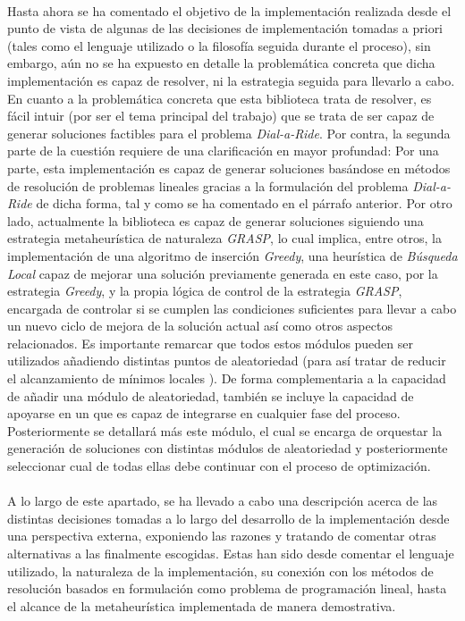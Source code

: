 \documentclass{subfiles}
\begin{document}
        \paragraph{}
        Hasta ahora se ha comentado el objetivo de la implementación realizada desde el punto de vista de algunas de las decisiones de implementación tomadas a priori (tales como el lenguaje utilizado o la filosofía seguida durante el proceso), sin embargo, aún no se ha expuesto en detalle la problemática concreta que dicha implementación es capaz de resolver, ni la estrategia seguida para llevarlo a cabo. En cuanto a la problemática concreta que esta biblioteca trata de resolver, es fácil intuir (por ser el tema principal del trabajo) que se trata de ser capaz de generar soluciones factibles para el problema \emph{Dial-a-Ride}. Por contra, la segunda parte de la cuestión requiere de una clarificación en mayor profundad: Por una parte, esta implementación es capaz de generar soluciones basándose en métodos de resolución de problemas lineales gracias a la formulación del problema \emph{Dial-a-Ride} de dicha forma, tal y como se ha comentado en el párrafo anterior. Por otro lado, actualmente la biblioteca es capaz de generar soluciones siguiendo una estrategia metaheurística de naturaleza \emph{GRASP}, lo cual implica, entre otros, la implementación de una algoritmo de inserción \emph{Greedy}, una heurística de \emph{Búsqueda Local} capaz de mejorar una solución previamente generada en este caso, por la estrategia \emph{Greedy}, y la propia lógica de control de la estrategia \emph{GRASP}, encargada de controlar si se cumplen las condiciones suficientes para llevar a cabo un nuevo ciclo de mejora de la solución actual así como otros aspectos relacionados. Es importante remarcar que todos estos módulos pueden ser utilizados añadiendo distintas puntos de aleatoriedad (para así tratar de reducir el alcanzamiento de mínimos locales ). De forma complementaria a la capacidad de añadir una módulo de aleatoriedad, también se incluye la capacidad de apoyarse en un  que es capaz de integrarse en cualquier fase del proceso. Posteriormente se detallará más este módulo, el cual se encarga de orquestar la generación de soluciones con distintas módulos de aleatoriedad y posteriormente seleccionar cual de todas ellas debe continuar con el proceso de optimización.

        \paragraph{}
        A lo largo de este apartado, se ha llevado a cabo una descripción acerca de las distintas decisiones tomadas a lo largo del desarrollo de la implementación desde una perspectiva externa, exponiendo las razones y tratando de comentar otras alternativas a las finalmente escogidas. Estas han sido desde comentar el lenguaje utilizado, la naturaleza de la implementación, su conexión con los métodos de resolución basados en formulación como problema de programación lineal, hasta el alcance de la metaheurística implementada de manera demostrativa.
\end{document}

